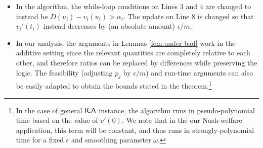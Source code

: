 \begin{itemize}

\item In the algorithm, the while-loop conditions on Lines 3 and 4 are changed to instead be $D(u_i) -  v_i(u_i) > \alpha_i$. The update on Line 8 is changed so that $v_i'(t_i)$ instead decreases by (an absolute amount) $\epsilon/m$. 

\item In our analysis, the arguments in Lemmas \ref{lem:under-bad} work in the additive setting
since the relevant quantities are completely relative to each other, and therefore ratios can be replaced by differences while preserving the logic. The feasibility (adjusting $p_j$ by $\epsilon/m$) and run-time arguments can also be easily adapted to obtain the bounds stated in the theorem.\footnote{In the case of general $\mathsf{ICA}$ instance, the algorithm runs in pseudo-polynomial time based on the value of $v'(0)$. We note that in the our Nash-welfare application, this term will be constant, and thus runs in strongly-polynomial time for a fixed $\epsilon$ and smoothing parameter $\omega$.}
\end{itemize} 







